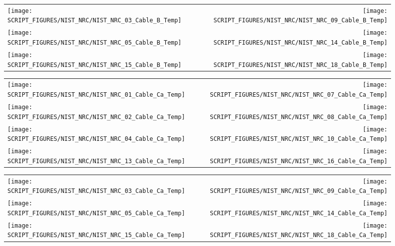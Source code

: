 \begin{figure}[!ht]
\begin{tabular*}{\textwidth}{l@{\extracolsep{\fill}}r}
\texttt{[image: SCRIPT\_FIGURES/NIST\_NRC/NIST\_NRC\_03\_Cable\_B\_Temp]} &
\texttt{[image: SCRIPT\_FIGURES/NIST\_NRC/NIST\_NRC\_09\_Cable\_B\_Temp]} \\
\texttt{[image: SCRIPT\_FIGURES/NIST\_NRC/NIST\_NRC\_05\_Cable\_B\_Temp]} &
\texttt{[image: SCRIPT\_FIGURES/NIST\_NRC/NIST\_NRC\_14\_Cable\_B\_Temp]} \\
\texttt{[image: SCRIPT\_FIGURES/NIST\_NRC/NIST\_NRC\_15\_Cable\_B\_Temp]} &
\texttt{[image: SCRIPT\_FIGURES/NIST\_NRC/NIST\_NRC\_18\_Cable\_B\_Temp]}
\end{tabular*}
\label{NIST_NRC_Cable_B_Open}
\end{figure}

\begin{figure}[!ht]
\begin{tabular*}{\textwidth}{l@{\extracolsep{\fill}}r}
\texttt{[image: SCRIPT\_FIGURES/NIST\_NRC/NIST\_NRC\_01\_Cable\_Ca\_Temp]} &
\texttt{[image: SCRIPT\_FIGURES/NIST\_NRC/NIST\_NRC\_07\_Cable\_Ca\_Temp]} \\
\texttt{[image: SCRIPT\_FIGURES/NIST\_NRC/NIST\_NRC\_02\_Cable\_Ca\_Temp]} &
\texttt{[image: SCRIPT\_FIGURES/NIST\_NRC/NIST\_NRC\_08\_Cable\_Ca\_Temp]} \\
\texttt{[image: SCRIPT\_FIGURES/NIST\_NRC/NIST\_NRC\_04\_Cable\_Ca\_Temp]} &
\texttt{[image: SCRIPT\_FIGURES/NIST\_NRC/NIST\_NRC\_10\_Cable\_Ca\_Temp]} \\
\texttt{[image: SCRIPT\_FIGURES/NIST\_NRC/NIST\_NRC\_13\_Cable\_Ca\_Temp]} &
\texttt{[image: SCRIPT\_FIGURES/NIST\_NRC/NIST\_NRC\_16\_Cable\_Ca\_Temp]}
\end{tabular*}
\label{NIST_NRC_Cable_Ca_Closed}
\end{figure}

\begin{figure}[!ht]
\begin{tabular*}{\textwidth}{l@{\extracolsep{\fill}}r}
\texttt{[image: SCRIPT\_FIGURES/NIST\_NRC/NIST\_NRC\_03\_Cable\_Ca\_Temp]} &
\texttt{[image: SCRIPT\_FIGURES/NIST\_NRC/NIST\_NRC\_09\_Cable\_Ca\_Temp]} \\
\texttt{[image: SCRIPT\_FIGURES/NIST\_NRC/NIST\_NRC\_05\_Cable\_Ca\_Temp]} &
\texttt{[image: SCRIPT\_FIGURES/NIST\_NRC/NIST\_NRC\_14\_Cable\_Ca\_Temp]} \\
\texttt{[image: SCRIPT\_FIGURES/NIST\_NRC/NIST\_NRC\_15\_Cable\_Ca\_Temp]} &
\texttt{[image: SCRIPT\_FIGURES/NIST\_NRC/NIST\_NRC\_18\_Cable\_Ca\_Temp]}
\end{tabular*}
\label{NIST_NRC_Cable_Ca_Open}
\end{figure}


